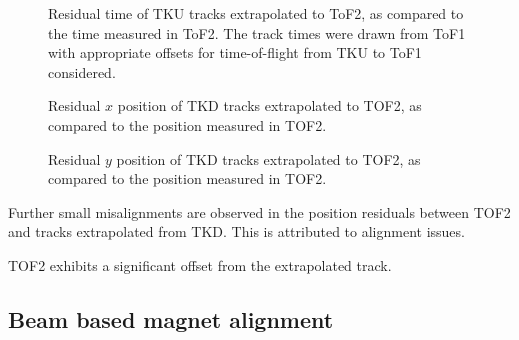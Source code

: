 \begin{figure}[!tbh]
    \centering
    {Residual time of TKU tracks extrapolated to ToF2, as compared to the time measured in ToF2. The track times were
    drawn from ToF1 with appropriate offsets for time-of-flight from TKU to ToF1 considered.}
\end{figure}

\begin{figure}[!tbh]
    \centering
    {Residual $x$ position of TKD tracks extrapolated to TOF2, as compared to the position measured in TOF2.}
\end{figure}

\begin{figure}[!tbh]
    \centering
    {Residual $y$ position of TKD tracks extrapolated to TOF2, as compared to the position measured in TOF2.}
\end{figure}

Further small misalignments are observed in the position residuals between TOF2
and tracks extrapolated from TKD. This is attributed to alignment issues.

TOF2 exhibits a significant offset from the extrapolated track.

\subsection{Beam based magnet alignment}
\label{SubSect:TM_Magnet_Alignment}
